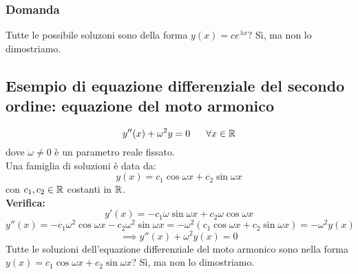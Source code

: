\documentclass[../main.tex]{subfiles}
\begin{document}
\subsubsection{Domanda}
Tutte le possibile soluzoni sono della forma $y(x) = ce^{\lambda x}$? Sì, ma
non lo dimostriamo.

\subsection{Esempio di equazione differenziale del secondo ordine: equazione del moto armonico}
\[
    y''(x) + \omega^2 y = 0 \ \ \ \ \ \forall x \in \R
\]
dove $\omega \ne 0$ è un parametro reale fissato.\\ Una famiglia di soluzioni è
data da:
\[
    y(x) = c_1\cos{\omega x} + c_2\sin{\omega x}
\]
con $c_1, c_2 \in \mathbb{R}$ costanti in $\mathbb{R}$.\\ \textbf{Verifica:}\\
\[
    y'(x) = -c_1\omega\sin{\omega x} + c_2\omega\cos{\omega x}
\]
\[
    y''(x) = -c_1\omega^2\cos{\omega x} - c_2\omega^2\sin{\omega x} = -\omega^2 (c_1\cos{\omega x} + c_2\sin{\omega x}) = -\omega^2 y(x)
\]
\[
    \implies y''(x) + \omega^2 y(x) = 0
\]
Tutte le soluzioni dell'equazione differenziale del moto armonico sono nella
forma $y(x) = c_1\cos{\omega x} + c_2\sin{\omega x}$? Sì, ma non lo
dimostriamo.
\end{document}

